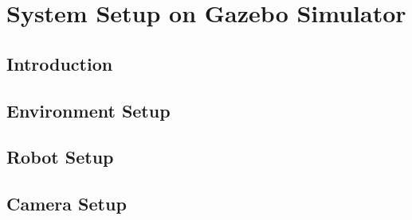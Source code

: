 \chapter{System Setup on Gazebo Simulator}
\label{app:gazebo_setup}

\section{Introduction}
\label{sec:gazebo_setup_introduction}

\section{Environment Setup}
\label{sec:gazebo_setup_introduction}

\section{Robot Setup}
\label{sec:gazebo_setup_introduction}

\section{Camera Setup}
\label{sec:gazebo_setup_introduction}